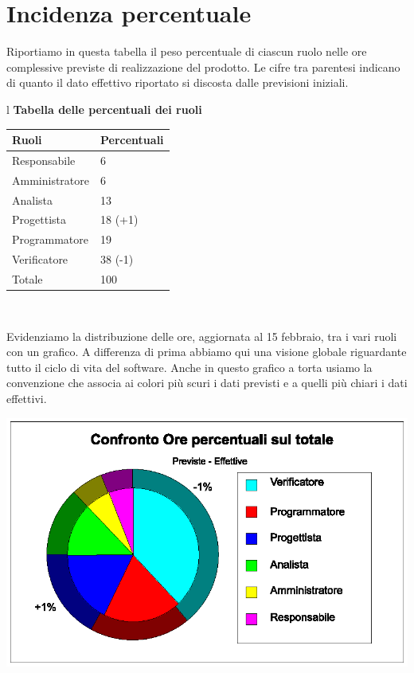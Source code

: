 \documentclass[11pt,titlepage,a4paper]{report}
\begin{document}
\section{Incidenza percentuale}
Riportiamo in questa tabella il peso percentuale di ciascun ruolo nelle ore
complessive previste di realizzazione del prodotto. Le cifre tra parentesi indicano di quanto il dato effettivo riportato si discosta dalle previsioni iniziali.
\begin{table}[hbtp]
\large{
\begin{tabular}{l}
\Large{\textbf{\textsf{Tabella delle percentuali dei ruoli}}} \\
\begin{tabular}{||p{6cm}||p{4cm}||}
\hline

\textbf{Ruoli} & \textbf{Percentuali}\\
\hline
{Responsabile}&6\\ 
\hline 
{Amministratore} &6\\ 
\hline
{Analista} &13 \\
\hline
{Progettista} &18 \footnotesize{(+1)}\\
\hline
{Programmatore} &19\\
\hline
{Verificatore} &38 \footnotesize{(-1)} \\
\hline
{Totale} &100 \\
\hline

\end{tabular} \\
\end{tabular}
}
\end{table}

Evidenziamo la distribuzione delle ore, aggiornata al 15 febbraio, tra i vari ruoli con un grafico. A differenza di prima abbiamo qui una visione globale riguardante tutto il ciclo di vita del software.
Anche in questo grafico a torta usiamo la convenzione che associa ai colori pi\`u scuri i dati previsti e a quelli pi\`u chiari i dati effettivi.


\begin{center}
\includegraphics [width=1\textwidth] {confronto-ore-totale.eps}
\end{center}
\end{document}
